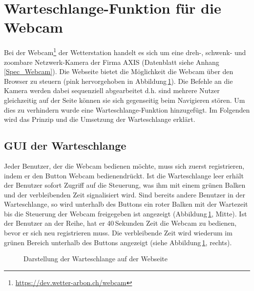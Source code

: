 \section{Warteschlange-Funktion für die Webcam}
Bei der Webcam\footnote{\url{https://dev.wetter-arbon.ch/webcam}} der Wetterstation handelt es sich um eine dreh-, schwenk- und zoombare Netzwerk-Kamera der Firma AXIS (Datenblatt siehe Anhang\,\ref{Spec_Webcam}). Die Webseite bietet die Möglichkeit die Webcam über den Browser zu steuern (pink hervorgehoben in Abbildung\,\ref{img:warteschlange}). Die Befehle an die Kamera werden dabei sequenziell abgearbeitet d.h. sind mehrere Nutzer gleichzeitig auf der Seite können sie sich gegenseitig beim Navigieren stören. Um dies zu verhindern wurde eine Warteschlange-Funktion hinzugefügt. Im Folgenden wird das Prinzip und die Umsetzung der Warteschlange erklärt.

\subsection{GUI der Warteschlange}
Jeder Benutzer, der die Webcam bedienen möchte, muss sich zuerst registrieren, indem er den Button \flqq Webcam bedienen\frqq drückt. Ist die Warteschlange leer erhält der Benutzer sofort Zugriff auf die Steuerung, was ihm mit einem grünen Balken und der verbleibenden Zeit signalisiert wird. Sind bereits andere Benutzer in der Warteschlange, so wird unterhalb des Buttons ein roter Balken mit der Wartezeit bis die Steuerung der Webcam freigegeben ist angezeigt (Abbildung\,\ref{img:warteschlange}, Mitte). Ist der Benutzer an der Reihe, hat er 40\,Sekunden Zeit die Webcam zu bedienen, bevor er sich neu registrieren muss. Die verbleibende Zeit wird wiederum im grünen Bereich unterhalb des Buttons angezeigt (siehe Abbildung\,\ref{img:warteschlange}, rechts).
 \newline


\begin{figure}[htbp!]
	\centering
	\caption{Darstellung der Warteschlange auf der Webseite}
	\label{img:warteschlange}
\end{figure}


